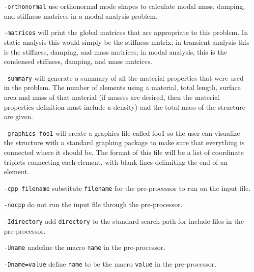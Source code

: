 \begin{dispitems}
\item [\tt -orthonormal]
        use orthonormal mode shapes to calculate modal mass, damping, and
        stiffness matrices in a modal analysis problem. 

\item [\tt -matrices]
	will print the global matrices that are appropriate to this problem.
        In static analysis this would simply be the stiffness matrix;
        in transient analysis this is the stiffness, damping, and 
        mass matrices; in modal analysis, this is the condensed stiffness,
        damping, and mass matrices.

\item [\tt -summary]
	will generate a summary of all the material properties that 
	were used in the problem.  The number of elements using a material,
	total length, surface area and mass of that material (if 
	masses are desired, then the material properties definition 
	must include a density) and the total mass of the structure
        are given.

\item [\tt -graphics foo1]
	will create a graphics file called foo1 so the user can 
	visualize the structure with a standard graphing package to 
	make sure that everything is connected where it should be.  
	The format of this file will be a list of coordinate triplets 
	connecting each element, with blank lines delimiting the end 
	of an element.

\item [\tt -cpp filename]
	substitute {\tt filename} for the pre-processor to run on the 
	input file.

\item [\tt -nocpp]
   	do not run the input file through the pre-processor.

\item [\tt -Idirectory]
	add {\tt directory} to the standard search path for include files in
	the pre-processor.

\item [\tt -Uname]
   	undefine the macro {\tt name} in the pre-processor.

\item [\tt -Dname=value]
	define {\tt name} to be the macro {\tt value} in the pre-processor.
\end{dispitems}


